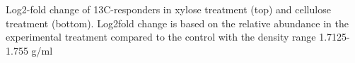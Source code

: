 Log2-fold change of 13C-responders in xylose treatment (top) and cellulose treatment (bottom).  Log2fold change is based on the relative abundance in the experimental treatment compared to the control with the density range 1.7125-1.755 g/ml